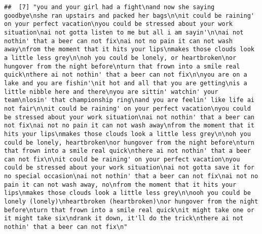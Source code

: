 \documentclass[]{article}
\begin{document}
\begin{verbatim}
##  [7] "you and your girl had a fight\nand now she saying goodbye\nshe ran upstairs and packed her bags\n\nit could be raining' on your perfect vacation\nyou could be stressed about your work situation\nai not gotta listen to me but all i am sayin'\n\nai not nothin' that a beer can not fix\nai not no pain it can not wash away\nfrom the moment that it hits your lips\nmakes those clouds look a little less grey\n\noh you could be lonely, or heartbroken\nor hungover from the night before\nturn that frown into a smile real quick\nthere ai not nothin' that a beer can not fix\n\nyou are on a lake and you are fishin'\nit hot and all that you are getting\nis a little nibble here and there\nyou are sittin' watchin' your team\nlosin' that championship ring\nand you are feelin' like life ai not fair\n\nit could be raining' on your perfect vacation\nyou could be stressed about your work situation\nai not nothin' that a beer can not fix\nai not no pain it can not wash away\nfrom the moment that it hits your lips\nmakes those clouds look a little less grey\n\noh you could be lonely, heartbroken\nor hungover from the night before\nturn that frown into a smile real quick\nthere ai not nothin' that a beer can not fix\n\nit could be raining' on your perfect vacation\nyou could be stressed about your work situation\nai not gotta save it for no special occasion\nai not nothin' that a beer can not fix\nai not no pain it can not wash away, no\nfrom the moment that it hits your lips\nmakes those clouds look a little less grey\n\nooh you could be lonely (lonely)\nheartbroken (heartbroken)\nor hungover from the night before\nturn that frown into a smile real quick\nit might take one or it might take six\ndrank it down, it'll do the trick\nthere ai not nothin' that a beer can not fix\n"                                                                                                                                                                                                                                                                                                                                                                                                                                                                                                                                                                                                                                                                                                                                                                                                                                                                                                                                                                                                                                                                                                                            

\end{verbatim}
\end{document}
